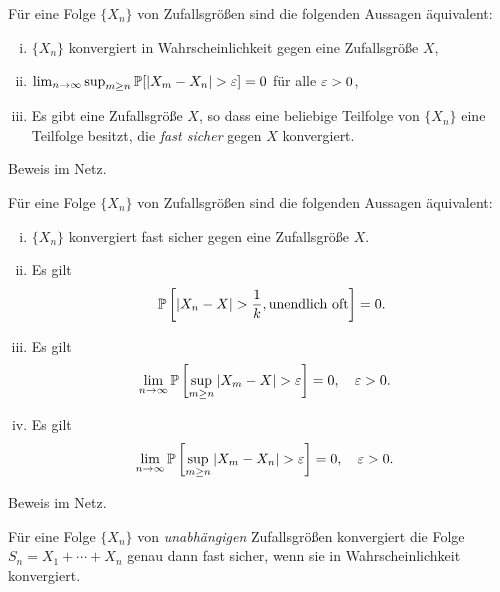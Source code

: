 \clearpage

\begin{thm}
  Für eine Folge $\{ X_n \}$ von Zufallsgrößen sind die folgenden Aussagen
  äquivalent:
  \begin{enumerate}[(i)]
  \item $\{X_n\}$ konvergiert in Wahrscheinlichkeit gegen eine Zufallsgröße
    $X$,
  \item $\lim_{n \to \infty}  \sup_{m \ge n} \mathbb{P} [ |X_m - X_n | > \varepsilon ] = 0$
    für alle $\varepsilon > 0$,
  \item Es gibt eine Zufallsgröße $X$, so dass eine beliebige Teilfolge von
    $\{X_n\}$ eine Teilfolge besitzt, die \emph{fast sicher} gegen $X$
    konvergiert.
  \end{enumerate}
\end{thm}

Beweis im Netz.

\begin{thm}
  Für eine Folge $\{X_n\}$ von Zufallsgrößen sind die folgenden Aussagen
  äquivalent:
  \begin{enumerate}[(i)]
  \item $\{X_n\}$  konvergiert fast sicher gegen eine Zufallsgröße $X$.
  \item Es gilt
    \[ \mathbb{P}\left[ |X_n - X| > \frac{1}{k}, \text{unendlich oft} \right] = 0. \]
  \item Es gilt
    \begin{align*}
      \lim_{n \to \infty} \mathbb{P} \left[ \sup_{m \ge n} |X_m - X| > \varepsilon \right]
      &= 0, \quad \varepsilon > 0.
    \end{align*}
  \item Es gilt
    \begin{align*}
      \lim_{n \to \infty} \mathbb{P} \left[ \sup_{m \ge n} |X_m - X_n| > \varepsilon \right]
      &= 0, \quad \varepsilon > 0.
    \end{align*}
  \end{enumerate}
\end{thm}

Beweis im Netz.

\begin{thm}[Levy]
  Für eine Folge $\{X_n\}$ von \emph{unabhängigen} Zufallsgrößen konvergiert die
  Folge $S_n = X_1 + \cdots + X_n$ genau dann fast sicher, wenn sie in
  Wahrscheinlichkeit konvergiert.
\end{thm}


